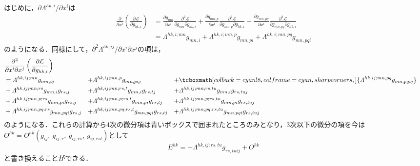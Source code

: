 \documentclass[12pt, a4paper]{jsarticle}
\newcommand{\lam}[1]{\varLambda^{#1}}
\begin{document}
はじめに，\(\partial \lam{hk,i} / \partial x^i\)は
\begin{align*}
  \frac{\partial}{\partial x^{i}}\left(\frac{\partial \mathcal{L}}{\partial g_{hk,i}}\right) & = \frac{\partial g_{m n}}{\partial x^{i}} \frac{\partial^{2} \mathcal{L}}{\partial g_{m n} \partial g_{h k, i}}+\frac{\partial q_{m n, p}}{\partial x^{i}} \frac{\partial^{2} \mathcal{L}}{\partial g_{m n, p} \partial g_{h k, i}} +\frac{\partial g_{m n, p q}}{\partial x^{i}} \frac{\partial^{2} \mathcal{L}}{\partial g_{m n, p q} \partial g_{h k, i}} \\
                                                                                             & = \lam{hk,i;mn} g_{mn,i} +\lam{hk,i;mn,p} g_{mn,pi}+\lam{hk,i;mn,pq} g_{mn,pqi}
\end{align*}
のようになる．同様にして，\(\partial^2 \lam{hk,ij} / \partial x^i \partial x^j\)の項は，
\begin{align*}
   & \frac{\partial^2}{\partial x^{i}\partial x^{j}}\left(\frac{\partial \mathcal{L}}{\partial g_{hk,i}}\right)                                                                                                     \\
   & = \lam{hk,ij;mn} g_{mn,ij}                                                                                 & + & \lam{hk,ij;mn,p} g_{mn,pij}                & + & \tcboxmath[
    colback=cyan!8,   %
    colframe=cyan,     %
    sharp corners,     %
  ]{
    \lam{hk,ij;mn,pq} g_{mn,pqij}
  }                                                                                                                                                                                                                 \\
   & + \lam{hk,ij;mn;rs} g_{mn,i}g_{rs,j}                                                                       & + & \lam{hk,ij;mn;rs,t} g_{mn,i}g_{rs,tj}      & + & \lam{hk,ij;mn;rs,tu} g_{mn,i}g_{rs,tuj}      \\
   & + \lam{hk,ij;mn,p;rs} g_{mn,pi}g_{rs,j}                                                                    & + & \lam{hk,ij;mn,p;rs,t} g_{mn,pi}g_{rs,tj}   & + & \lam{hk,ij;mn,p;rs,tu} g_{mn,pi}g_{rs,tuj}   \\
   & + \lam{hk,ij;mn,pq;rs} g_{mn,pqi}g_{rs,j}                                                                  & + & \lam{hk,ij;mn,pq;rs,t} g_{mn,pqi}g_{rs,tj} & + & \lam{hk,ij;mn,pq;rs,tu} g_{mn,pqi}g_{rs,tuj}
\end{align*}
のようになる．これらの計算から4次の微分項は青いボックスで囲まれたところのみとなり，3次以下の微分の項を今は\(O^{hk} = O^{hk}(g_{ij},\: g_{ij,r}, \: g_{ij,rs},\: g_{ij,rst})\)として
\begin{equation*}
  E^{hk} =- \lam{hk,ij;rs,tu} g_{rs,tuij}+O^{hk}
  \tag{2.13} \label{EL2}
\end{equation*}
と書き換えることができる．
\end{document}
